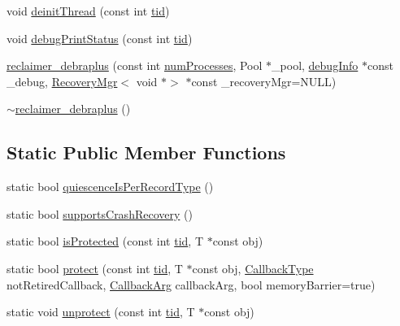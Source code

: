 \begin{DoxyCompactItemize}
\item 
void \hyperlink{classreclaimer__debraplus_a9456d4b88028481c68222ab888faecf2}{deinit\+Thread} (const int \hyperlink{microbench_2main_8cpp_a9ca9869868fe7e7a38a921cc7de4103f}{tid})
\item 
void \hyperlink{classreclaimer__debraplus_a18b17edf9cb243d2bccb89bab3c4bfe6}{debug\+Print\+Status} (const int \hyperlink{microbench_2main_8cpp_a9ca9869868fe7e7a38a921cc7de4103f}{tid})
\item 
\hyperlink{classreclaimer__debraplus_aa3aecd07af32bce209348bd4eb10f2ee}{reclaimer\+\_\+debraplus} (const int \hyperlink{testing_8cpp_aa085812188e21ede75351d88b9b2c30d}{num\+Processes}, Pool $\ast$\+\_\+pool, \hyperlink{classdebugInfo}{debug\+Info} $\ast$const \+\_\+debug, \hyperlink{classRecoveryMgr}{Recovery\+Mgr}$<$ void $\ast$$>$ $\ast$const \+\_\+recovery\+Mgr=N\+U\+LL)
\item 
\hyperlink{classreclaimer__debraplus_a29be21fd0206a08aafd27319b83d7ba6}{$\sim$reclaimer\+\_\+debraplus} ()
\end{DoxyCompactItemize}
\subsection*{Static Public Member Functions}
\begin{DoxyCompactItemize}
\item 
static bool \hyperlink{classreclaimer__debraplus_a5fcce88c53a16023e412f0d1b9d3ae09}{quiescence\+Is\+Per\+Record\+Type} ()
\item 
static bool \hyperlink{classreclaimer__debraplus_a13df7939ef9ba01add47fd3d3d76fb46}{supports\+Crash\+Recovery} ()
\item 
static bool \hyperlink{classreclaimer__debraplus_a94a01ba5a46a5c64d47d8008b6f406ad}{is\+Protected} (const int \hyperlink{microbench_2main_8cpp_a9ca9869868fe7e7a38a921cc7de4103f}{tid}, T $\ast$const obj)
\item 
static bool \hyperlink{classreclaimer__debraplus_a79d06813ec16076bc9ea53b810b49951}{protect} (const int \hyperlink{microbench_2main_8cpp_a9ca9869868fe7e7a38a921cc7de4103f}{tid}, T $\ast$const obj, \hyperlink{globals_8h_a57f5c0d40b156d7d996492fb2f16e3cd}{Callback\+Type} not\+Retired\+Callback, \hyperlink{globals_8h_a3de64ef48066ac6430631c8b81a15345}{Callback\+Arg} callback\+Arg, bool memory\+Barrier=true)
\item 
static void \hyperlink{classreclaimer__debraplus_a2d27d53de5e35e26b12faf51b330ef13}{unprotect} (const int \hyperlink{microbench_2main_8cpp_a9ca9869868fe7e7a38a921cc7de4103f}{tid}, T $\ast$const obj)
\end{DoxyCompactItemize}
